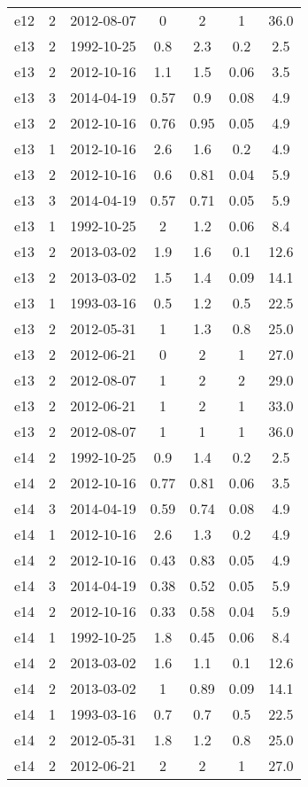 \begin{table*}[htp]
\begin{tabular}{ccccccc}
e12 & 2 & 2012-08-07 & 0 & 2 & 1 & 36.0 \\
e13 & 2 & 1992-10-25 & 0.8 & 2.3 & 0.2 & 2.5 \\
e13 & 2 & 2012-10-16 & 1.1 & 1.5 & 0.06 & 3.5 \\
e13 & 3 & 2014-04-19 & 0.57 & 0.9 & 0.08 & 4.9 \\
e13 & 2 & 2012-10-16 & 0.76 & 0.95 & 0.05 & 4.9 \\
e13 & 1 & 2012-10-16 & 2.6 & 1.6 & 0.2 & 4.9 \\
e13 & 2 & 2012-10-16 & 0.6 & 0.81 & 0.04 & 5.9 \\
e13 & 3 & 2014-04-19 & 0.57 & 0.71 & 0.05 & 5.9 \\
e13 & 1 & 1992-10-25 & 2 & 1.2 & 0.06 & 8.4 \\
e13 & 2 & 2013-03-02 & 1.9 & 1.6 & 0.1 & 12.6 \\
e13 & 2 & 2013-03-02 & 1.5 & 1.4 & 0.09 & 14.1 \\
e13 & 1 & 1993-03-16 & 0.5 & 1.2 & 0.5 & 22.5 \\
e13 & 2 & 2012-05-31 & 1 & 1.3 & 0.8 & 25.0 \\
e13 & 2 & 2012-06-21 & 0 & 2 & 1 & 27.0 \\
e13 & 2 & 2012-08-07 & 1 & 2 & 2 & 29.0 \\
e13 & 2 & 2012-06-21 & 1 & 2 & 1 & 33.0 \\
e13 & 2 & 2012-08-07 & 1 & 1 & 1 & 36.0 \\
e14 & 2 & 1992-10-25 & 0.9 & 1.4 & 0.2 & 2.5 \\
e14 & 2 & 2012-10-16 & 0.77 & 0.81 & 0.06 & 3.5 \\
e14 & 3 & 2014-04-19 & 0.59 & 0.74 & 0.08 & 4.9 \\
e14 & 1 & 2012-10-16 & 2.6 & 1.3 & 0.2 & 4.9 \\
e14 & 2 & 2012-10-16 & 0.43 & 0.83 & 0.05 & 4.9 \\
e14 & 3 & 2014-04-19 & 0.38 & 0.52 & 0.05 & 5.9 \\
e14 & 2 & 2012-10-16 & 0.33 & 0.58 & 0.04 & 5.9 \\
e14 & 1 & 1992-10-25 & 1.8 & 0.45 & 0.06 & 8.4 \\
e14 & 2 & 2013-03-02 & 1.6 & 1.1 & 0.1 & 12.6 \\
e14 & 2 & 2013-03-02 & 1 & 0.89 & 0.09 & 14.1 \\
e14 & 1 & 1993-03-16 & 0.7 & 0.7 & 0.5 & 22.5 \\
e14 & 2 & 2012-05-31 & 1.8 & 1.2 & 0.8 & 25.0 \\
e14 & 2 & 2012-06-21 & 2 & 2 & 1 & 27.0 \\

\end{tabular}
\end{table*}
